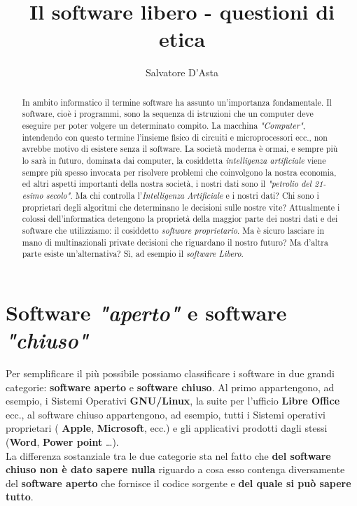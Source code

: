 \documentclass[]{article}
\title{Il software libero - questioni di etica }
\author{Salvatore D'Asta}
\begin{document}
\maketitle

\begin{abstract}
In ambito informatico il termine software ha assunto un'importanza fondamentale. Il software, cioè i programmi, sono  la sequenza di istruzioni che  un computer deve eseguire per poter volgere un determinato compito. La macchina \textit{"Computer"}, intendendo con questo termine l'insieme fisico di circuiti e microprocessori ecc., non avrebbe motivo di esistere senza il software. La società moderna è ormai, e sempre più lo sarà in futuro, dominata dai computer, la cosiddetta \textit{intelligenza artificiale} viene sempre più spesso invocata per risolvere problemi che coinvolgono la nostra economia, ed altri aspetti importanti della nostra società, i nostri dati sono il \textit{"petrolio del 21-esimo secolo"}. Ma chi controlla l'\textit{Intelligenza Artificiale} e i nostri dati? Chi sono i proprietari degli algoritmi che determinano le decisioni sulle nostre vite? Attualmente i colossi dell'informatica detengono la proprietà della maggior parte dei nostri dati e dei software che utilizziamo: il cosiddetto \textit{software proprietario}. Ma è sicuro lasciare in mano di multinazionali private decisioni che riguardano il nostro futuro? Ma d'altra parte esiste un'alternativa? Sì, ad esempio il \textit{software Libero}.       
\end{abstract}


\section{Software\textit{ "aperto"} e software \textit{"chiuso"}}
Per semplificare il più possibile possiamo classificare i software in due grandi categorie: \textbf{software aperto} e \textbf{software chiuso}. Al primo appartengono, ad esempio, i Sistemi Operativi \textbf{GNU/Linux}, la suite per l’ufficio \textbf{Libre Office} ecc.,  al software chiuso appartengono, ad esempio, tutti i Sistemi operativi proprietari ( \textbf{Apple}, \textbf{Microsoft}, ecc.) e gli applicativi prodotti dagli stessi (\textbf{Word}, \textbf{Power point} …). \\  

La differenza sostanziale tra le due categorie sta nel fatto che \textbf{del software chiuso non è dato sapere nulla} riguardo a cosa esso contenga diversamente del \textbf{software aperto} che fornisce il codice sorgente e \textbf{del quale si può sapere tutto}. \\
\end{document}
